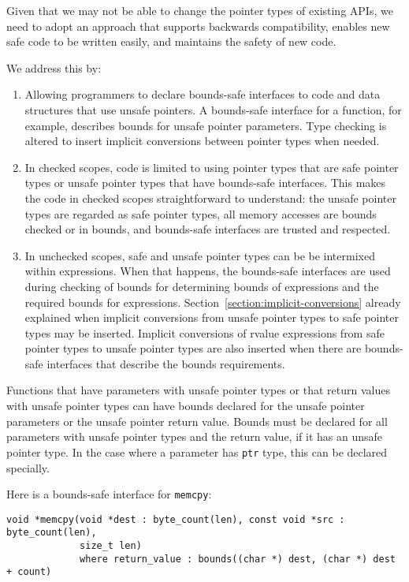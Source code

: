 Given that we may not be able to change the pointer types of existing
APIs, we need to adopt an approach that supports backwards
compatibility, enables new safe code to be written easily, and maintains
the safety of new code.

We address this by:

\begin{enumerate}
\item
  Allowing programmers to declare bounds-safe interfaces to code and
  data structures that use unsafe pointers. A bounds-safe interface for
  a function, for example, describes bounds for unsafe pointer
  parameters.   Type checking is altered to insert implicit conversions
  between pointer types when needed.
\item
  In checked scopes, code is limited to using pointer types that are 
  safe pointer types or unsafe pointer types that have bounds-safe interfaces.  
  This makes the code in checked scopes straightforward to understand:
  the unsafe pointer types are regarded as safe pointer types, all memory 
  accesses are bounds checked or in bounds, and bounds-safe interfaces are trusted
  and respected.
\item
  In unchecked scopes, safe and unsafe pointer types can be
  be intermixed within expressions.  When that happens, the bounds-safe
  interfaces are used during checking of bounds for determining bounds
  of expressions and the required bounds for expressions. 
  Section~\ref{section:implicit-conversions} already
  explained when implicit conversions from unsafe pointer types to safe pointer
  types may be inserted.   Implicit conversions of rvalue expressions 
  from safe pointer types to unsafe pointer types are also inserted when
  there are bounds-safe interfaces that describe the bounds requirements.
\end{enumerate}

Functions that have parameters with unsafe pointer types or that return
values with unsafe pointer types can have bounds declared for the unsafe
pointer parameters or the unsafe pointer return value. Bounds must be
declared for all parameters with unsafe pointer types and the return
value, if it has an unsafe pointer type. In the case where a parameter
has \texttt{ptr} type, this can be declared specially.

Here is a bounds-safe interface for \texttt{memcpy}:
\begin{verbatim}
void *memcpy(void *dest : byte_count(len), const void *src : byte_count(len), 
             size_t len) 
             where return_value : bounds((char *) dest, (char *) dest + count)
\end{verbatim}

